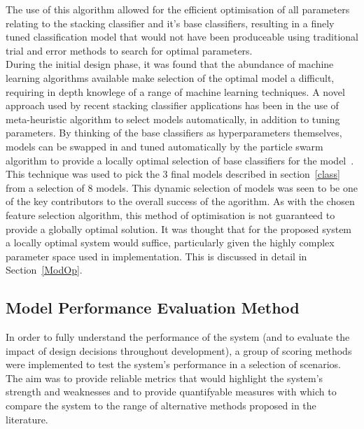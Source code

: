 \documentclass[titlepage, 12pt]{scrartcl} \usepackage{enumitem}
\begin{document}
The use of this algorithm allowed for the efficient optimisation of all parameters
relating to the stacking classifier and it's base classifiers, resulting in a
finely tuned classification model that would not have been produceable using
traditional trial and error methods to search for optimal parameters.\\
During the initial design phase, it was found that the abundance of machine
learning algorithms available make selection of the optimal model a difficult,
requiring in depth knowlege of a range of machine learning techniques. A novel
approach used by recent stacking classifier applications has been in the use of
meta-heuristic algorithm to select models automatically, in addition to tuning
parameters. By thinking of the base classifiers as hyperparameters themselves,
models can be swapped in and tuned automatically by the particle swarm
algorithm to provide a locally optimal selection of base classifiers for the
model~\parencite{Sesmero2015}. This technique was used to pick the 3 final
models described in section~\ref{class} from a selection of 8 models. This
dynamic selection of models was seen to be one of the key contributors to the
overall success of the agorithm. As with the chosen feature selection
algorithm, this method of optimisation is not guaranteed to provide a globally
optimal solution. It was thought that for the proposed system a locally optimal
system would suffice, particularly given the highly complex parameter space
used in implementation. This is discussed in detail in Section~\ref{ModOp}.

\subsection{Model Performance Evaluation Method}\label{metrics}
In order to fully understand the performance of the system (and to evaluate the
impact of design decisions throughout development), a group of scoring methods
were implemented to test the system's performance in a selection of scenarios.
The aim was to provide reliable metrics that would highlight the system's
strength and weaknesses and to provide quantifyable measures with which to
compare the system to the range of alternative methods proposed in the
literature.\\
\end{document}
